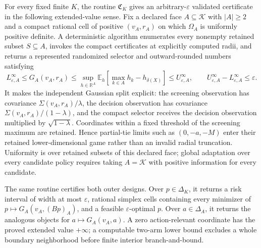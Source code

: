 For every fixed finite \(K\), the routine \(\mathfrak C_K\) gives an arbitrary-\(\varepsilon\) validated certificate in the following extended-value sense.  Fix a declared face \(A\subseteq\mathcal K\) with \(|A|\geq2\) and a compact rational cell of positive \((v_A,r_A)\) on which \(\Omega_A\) is uniformly positive definite.  A deterministic algorithm enumerates every nonempty retained subset \(S\subseteq A\), invokes the compact certificates at explicitly computed radii, and returns a represented randomized selector and outward-rounded numbers satisfying
\[
L^{\infty}_{\varepsilon,A}\leq G_A(v_A,r_A)
\leq \sup_{h\in\mathbb R^A}\mathbb E_h\!\left[\max_{k\in A}h_k-h_{\delta(X)}\right]
\leq U^{\infty}_{\varepsilon,A},
\qquad U^{\infty}_{\varepsilon,A}-L^{\infty}_{\varepsilon,A}\leq\varepsilon.
\]
It makes the independent Gaussian split explicit: the screening observation has covariance \(\Sigma(v_A,r_A)/\lambda\), the decision observation has covariance \(\Sigma(v_A,r_A)/(1-\lambda)\), and the compact selector receives the decision observation multiplied by \(\sqrt{1-\lambda}\).  Coordinates within a fixed threshold of the screening maximum are retained.  Hence partial-tie limits such as \((0,-a,-M)\) enter their retained lower-dimensional game rather than an invalid radial truncation.  Uniformity is over retained subsets of this declared face; global adaptation over every candidate policy requires taking \(A=\mathcal K\) with positive information for every candidate.

The same routine certifies both outer designs.  Over \(p\in\Delta_K\), it returns a risk interval of width at most \(\varepsilon\), rational simplex cells containing every minimizer of \(p\mapsto G_A(v_A,(Bp)_A)\), and a feasible \(\varepsilon\)-optimal \(p\).  Over \(a\in\Delta_A\), it returns the analogous objects for \(a\mapsto G_A(v_A,a)\).  A zero action-relevant coordinate has the proved extended value \(+\infty\); a computable two-arm lower bound excludes a whole boundary neighborhood before finite interior branch-and-bound.

